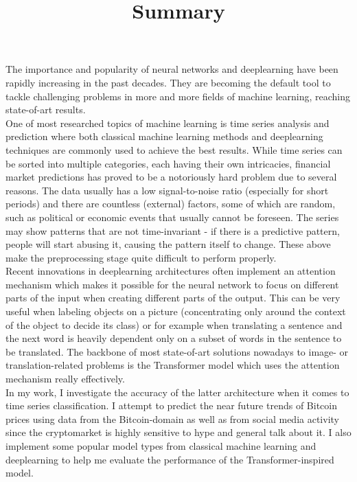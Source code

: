 \documentclass[12pt]{article}
\title{\vspace{-2.0cm}Summary}
\begin{document}
    \date{\vspace{-5ex}}
    \maketitle
    The importance and popularity of neural networks and deeplearning have been rapidly increasing in the past decades.
    They are becoming the default tool to tackle challenging problems in more and more fields of machine
    learning, reaching state-of-art results.\\
    \indent One of most researched topics of machine learning is time series analysis and prediction where both
    classical machine learning methods and deeplearning techniques are commonly used to achieve the best results.
    While time series can be sorted into multiple categories, each having their own intricacies,
    financial market predictions has proved to be a notoriously hard problem due to several reasons.
    The data usually has a low signal-to-noise ratio (especially for short periods) and there are countless (external) factors,
    some of which are random, such as political or economic events that usually cannot be foreseen.
    The series may show patterns that are not time-invariant - if there is a predictive pattern, people will start abusing it,
    causing the pattern itself to change.
    These above make the preprocessing stage quite difficult to perform properly.\\
    \indent Recent innovations in deeplearning architectures often implement an attention mechanism which makes
    it possible for the neural network to focus on different parts of the input when creating different parts of the output.
    This can be very useful when labeling objects on a picture (concentrating only around the context of the object to
    decide its class) or for example when translating a sentence and the next word is heavily dependent only
    on a subset of words in the sentence to be translated.
    The backbone of most state-of-art solutions nowadays to image- or translation-related problems is
    the Transformer model which uses the attention mechanism really effectively.\\
    \indent In my work, I investigate the accuracy of the latter architecture when it comes to time series classification.
    I attempt to predict the near future trends of Bitcoin prices using data from the Bitcoin-domain as well as
    from social media activity since the cryptomarket is highly sensitive to hype and general talk about it.
    I also implement some popular model types from classical machine learning and deeplearning to help me evaluate
    the performance of the Transformer-inspired model.
\end{document}
